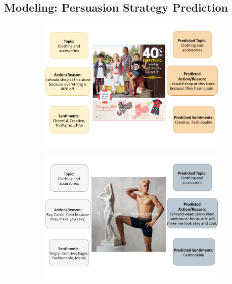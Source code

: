 \subsection{Modeling: Persuasion Strategy Prediction}
\label{sec:Persuasion Strategy Prediction Model}


\begin{figure}[!h]
    \centering
    \begin{subfigure}[b]{0.49\textwidth}
         \centering
         \includegraphics[width=\textwidth,scale=0.68]{images/preds_sup_1.pdf}
         \caption{}
         \label{fig:preds-sup-1}
     \end{subfigure}
     \begin{subfigure}[b]{0.49\textwidth}
         \centering
         \includegraphics[width=\textwidth,scale=0.68]{images/preds_sup_2.pdf}

\end{subfigure}
\end{figure}

